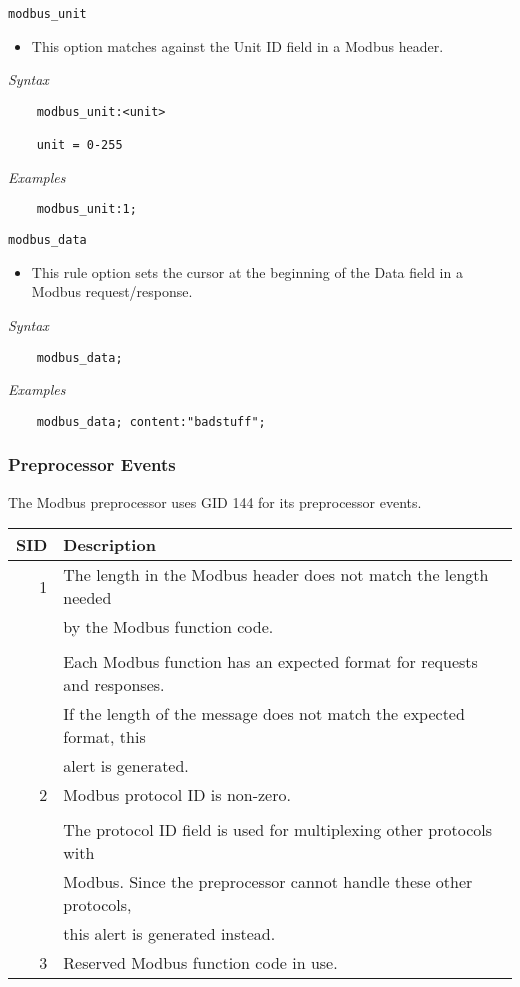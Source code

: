 \documentclass[english]{report}
\begin{document}
\texttt{modbus\_unit}
\label{modbus:modbus_unit}
\begin{itemize}
 \item[] This option matches against the Unit ID field in a Modbus header.
\end{itemize}

\textit{Syntax}
\footnotesize
\begin{verbatim}
    modbus_unit:<unit>

    unit = 0-255
\end{verbatim}
\normalsize
\textit{Examples}
\footnotesize
\begin{verbatim}
    modbus_unit:1;
\end{verbatim}
\normalsize

\texttt{modbus\_data}
\label{modbus:modbus_data}
\begin{itemize}
 \item[] This rule option sets the cursor at the beginning of the Data field
 in a Modbus request/response.
\end{itemize}

\textit{Syntax}
\footnotesize
\begin{verbatim}
    modbus_data;
\end{verbatim}
\normalsize

\textit{Examples}
\footnotesize
\begin{verbatim}
    modbus_data; content:"badstuff";
\end{verbatim}
\normalsize

\subsubsection{Preprocessor Events}
The Modbus preprocessor uses GID 144 for its preprocessor events.
\begin{longtable}{|r|p{13.5cm}|}

\hline
SID & Description\\
\hline
 1  & The length in the Modbus header does not match the length needed \\
    & by the Modbus function code. \\
&\\
    & Each Modbus function has an expected format for requests and responses. \\
    & If the length of the message does not match the expected format, this \\
    & alert is generated. \\
\hline
 2  & Modbus protocol ID is non-zero. \\
&\\
    & The protocol ID field is used for multiplexing other protocols with \\
    & Modbus. Since the preprocessor cannot handle these other protocols, \\
    & this alert is generated instead. \\
\hline
 3  & Reserved Modbus function code in use. \\
\hline
\end{longtable}
\end{document}
